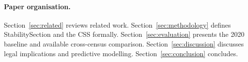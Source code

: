 \paragraph{Paper organisation.}
Section~\ref{sec:related} reviews related work.
Section~\ref{sec:methodology} defines StabilitySection and the CSS formally.
Section~\ref{sec:evaluation} presents the 2020 baseline and available
cross-census comparison.
Section~\ref{sec:discussion} discusses legal implications and predictive
modelling.
Section~\ref{sec:conclusion} concludes.

